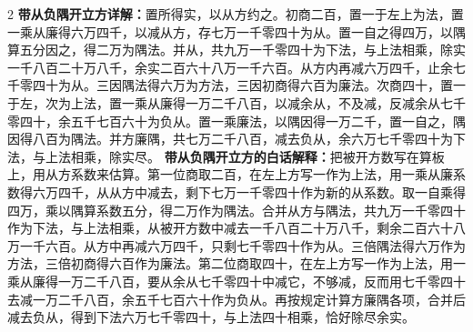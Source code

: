 \documentclass[11pt,a4paper]{article}
\begin{document}
\begin{paracol}{2}
\switchcolumn*
\small\textbf{带从负隅开立方详解：}置所得实，以从方约之。初商二百，置一于左上为法，置一乘从廉得六万四千，以减从方，存七万一千零四十为从。置一自之得四万，以隅算五分因之，得二万为隅法。并从，共九万一千零四十为下法，与上法相乘，除实一千八百二十万八千，余实二百六十八万一千六百。从方内再减六万四千，止余七千零四十为从。三因隅法得六万为方法，三因初商得六百为廉法。次商四十，置一于左，次为上法，置一乘从廉得一万二千八百，以减余从，不及减，反减余从七千零四十，余五千七百六十为负从。置一乘廉法，以隅因得一万二千，置一自之，隅因得八百为隅法。并方廉隅，共七万二千八百，减去负从，余六万七千零四十为下法，与上法相乘，除实尽。
\switchcolumn
\small\textbf{带从负隅开立方的白话解释：}把被开方数写在算板上，用从方系数来估算。第一位商取二百，在左上方写一作为上法，用一乘从廉系数得六万四千，从从方中减去，剩下七万一千零四十作为新的从系数。取一自乘得四万，乘以隅算系数五分，得二万作为隅法。合并从方与隅法，共九万一千零四十作为下法，与上法相乘，从被开方数中减去一千八百二十万八千，剩余二百六十八万一千六百。从方中再减六万四千，只剩七千零四十作为从。三倍隅法得六万作为方法，三倍初商得六百作为廉法。第二位商取四十，在左上方写一作为上法，用一乘从廉得一万二千八百，要从余从七千零四十中减它，不够减，反而用七千零四十去减一万二千八百，余五千七百六十作为负从。再按规定计算方廉隅各项，合并后减去负从，得到下法六万七千零四十，与上法四十相乘，恰好除尽余实。
\end{paracol}
\end{document}
